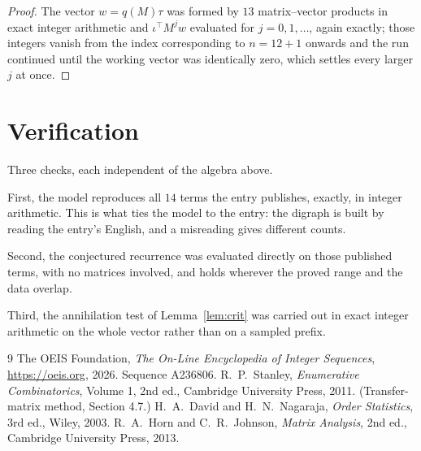 \documentclass[11pt,a4paper]{article}
\theoremstyle{plain}
\theoremstyle{definition}
\begin{document}
\begin{proof}
The vector $w=q(M)\tau$ was formed by $13$ matrix--vector products in exact integer
arithmetic and $\iota^{\!\top}M^{j}w$ evaluated for $j=0,1,\dots$, again exactly; those
integers vanish from the index corresponding to $n=12+1$ onwards and the run continued
until the working vector was identically zero, which settles every larger $j$ at once.
\end{proof}

\section{Verification}

Three checks, each independent of the algebra above.

First, the model reproduces all $14$ terms the entry publishes, exactly, in integer
arithmetic. This is what ties the model to the entry: the digraph is built by reading the
entry's English, and a misreading gives different counts.

Second, the conjectured recurrence was evaluated directly on those published terms, with no
matrices involved, and holds wherever the proved range and the data overlap.

Third, the annihilation test of Lemma~\ref{lem:crit} was carried out in exact integer
arithmetic on the whole vector rather than on a sampled prefix.

\begin{thebibliography}{9}
 The OEIS Foundation, \emph{The On-Line Encyclopedia of Integer
Sequences}, \url{https://oeis.org}, 2026. Sequence A236806.
 R.~P.~Stanley, \emph{Enumerative Combinatorics}, Volume 1, 2nd ed.,
Cambridge University Press, 2011. (Transfer-matrix method, Section 4.7.)
 H.~A.~David and H.~N.~Nagaraja, \emph{Order Statistics}, 3rd ed., Wiley,
2003.
 R.~A.~Horn and C.~R.~Johnson, \emph{Matrix Analysis}, 2nd ed., Cambridge
University Press, 2013.
\end{thebibliography}
\end{document}
